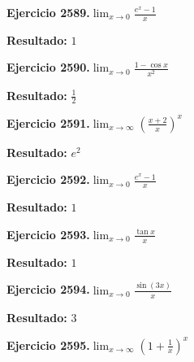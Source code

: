 \documentclass[10pt,a4paper]{article}
\begin{document}
\newpage
\begin{ejbox}
\textbf{Ejercicio 2589.}\quad $\lim_{x\to 0} \frac{e^x-1}{x}$
\end{ejbox}

\begin{solbox}
\textbf{Resultado:} \(\displaystyle 1\)
\end{solbox}

\begin{ejbox}
\textbf{Ejercicio 2590.}\quad $\lim_{x\to 0} \frac{1-\cos x}{x^2}$
\end{ejbox}

\begin{solbox}
\textbf{Resultado:} \(\displaystyle \frac{1}{2}\)
\end{solbox}

\begin{ejbox}
\textbf{Ejercicio 2591.}\quad $\lim_{x\to \infty} \left(\frac{x+2}{x}\right)^{x}$
\end{ejbox}

\begin{solbox}
\textbf{Resultado:} \(\displaystyle e^{2}\)
\end{solbox}

\newpage
\begin{ejbox}
\textbf{Ejercicio 2592.}\quad $\lim_{x\to 0} \frac{e^x-1}{x}$
\end{ejbox}

\begin{solbox}
\textbf{Resultado:} \(\displaystyle 1\)
\end{solbox}

\begin{ejbox}
\textbf{Ejercicio 2593.}\quad $\lim_{x\to 0} \frac{\tan x}{x}$
\end{ejbox}

\begin{solbox}
\textbf{Resultado:} \(\displaystyle 1\)
\end{solbox}

\begin{ejbox}
\textbf{Ejercicio 2594.}\quad $\lim_{x\to 0} \frac{\sin(3x)}{x}$
\end{ejbox}

\begin{solbox}
\textbf{Resultado:} \(\displaystyle 3\)
\end{solbox}

\newpage
\begin{ejbox}
\textbf{Ejercicio 2595.}\quad $\lim_{x\to \infty} \left(1+\frac{1}{x}\right)^x$
\end{ejbox}
\end{document}
